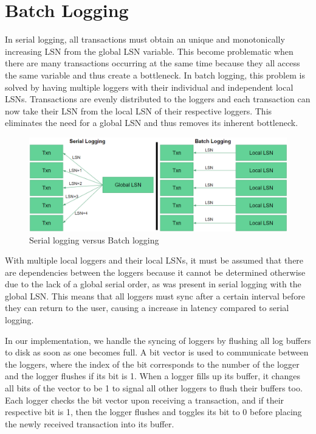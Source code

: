 \section{Batch Logging}

In serial logging, all transactions must obtain an unique and monotonically increasing LSN from the global LSN variable. This become problematic when there are many transactions occurring at the same time because they all access the same variable and thus create a bottleneck. In batch logging, this problem is solved by having multiple loggers with their individual and independent local LSNs. Transactions are evenly distributed to the loggers and each transaction can now take their LSN from the local LSN of their respective loggers. This eliminates the need for a global LSN and thus removes its inherent bottleneck.
\begin{figure}[h]
\caption{Serial logging versus Batch logging}
\includegraphics[width=\textwidth]{SerialvsBatch.png}
\end{figure}
With multiple local loggers and their local LSNs, it must be assumed that there are dependencies between the loggers because it cannot be determined otherwise due to the lack of a global serial order, as was present in serial logging with the global LSN. This means that all loggers must sync after a certain interval before they can return to the user, causing a increase in latency compared to serial logging.

In our implementation, we handle the syncing of loggers by flushing all log buffers to disk as soon as one becomes full. A bit vector is used to communicate between the loggers, where the index of the bit corresponds to the number of the logger and the logger flushes if its bit is 1. When a logger fills up its buffer, it changes all bits of the vector to be 1 to signal all other loggers to flush their buffers too. Each logger checks the bit vector upon receiving a transaction, and if their respective bit is 1, then the logger flushes  and toggles its bit to 0 before placing the newly received transaction into its buffer. 


